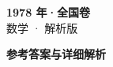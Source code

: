 \documentclass[zihao=-4, a4paper]{ctexart}
\begin{document}
\begin{center}
  {\Large\bfseries 1978 年·全国卷}\\[4pt]
  {\large 数学 · 解析版}
\end{center}
\medskip
{}

\clearpage
{}
\begin{center}{\Large\bfseries 参考答案与详细解析}\end{center}
\medskip

\end{document}
